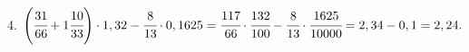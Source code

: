 4. $\left(\cfrac{31}{66}+1\cfrac{10}{33}\right)\cdot1,32-\cfrac{8}{13}\cdot0,1625=\cfrac{117}{66}\cdot\cfrac{132}{100}-\cfrac{8}{13}\cdot\cfrac{1625}{10000}=
2,34-0,1=2,24.$\\
